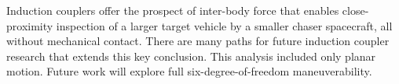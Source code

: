 \documentclass{article}
\begin{document}
Induction couplers offer the prospect of inter-body force that enables close-proximity inspection of a larger target vehicle by a smaller chaser spacecraft, all without mechanical contact. There are many paths for future induction coupler research that extends this key conclusion. This analysis included only planar motion. Future work will explore full six-degree-of-freedom maneuverability.


\end{document}
